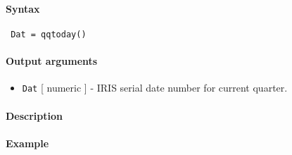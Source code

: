 


	\paragraph{Syntax}
 
 \begin{verbatim}
 Dat = qqtoday()
 \end{verbatim}
 
 \paragraph{Output arguments}
 
 \begin{itemize}
 \item
   \texttt{Dat} {[} numeric {]} - IRIS serial date number for current
   quarter.
 \end{itemize}
 
 \paragraph{Description}
 
 \paragraph{Example}


